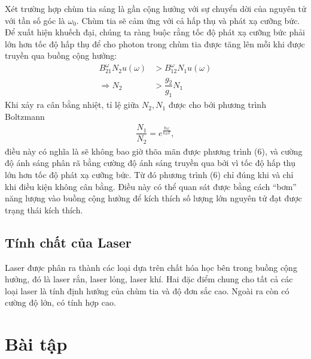 \documentclass{article}
\newcommand{\f}[2]{\dfrac{#1}{#2}}
\begin{document}
Xét trường hợp chùm tia sáng là gần cộng hưởng với sự chuyển dời của nguyên tử với tần số góc là $\omega_0$. Chùm tia sẽ cảm ứng với cả hấp thụ và phát xạ cưỡng bức. Để xuất hiện khuếch đại, chúng ta ràng buộc rằng tốc độ phát xạ cưỡng bức phải lớn hơn tốc độ hấp thụ để cho photon trong chùm tia được tăng lên mỗi khi được truyền qua buồng cộng hưởng:
\begin{align}
	B_{21}^{\omega} N_2 u(\omega) & > B_{12}^{\omega} N_1 u(\omega) \\
	\Rightarrow N_2               & > \f{g_2}{g_1}N_1
\end{align}
Khi xảy ra cân bằng nhiệt, tỉ lệ giữa $N_2,N_1$ được cho bởi phương trình Boltzmann
\begin{align*}
	\f{N_1}{N_2} = e^{\frac{\hbar \omega}{k_B T}},
\end{align*}
điều này có nghĩa là sẽ không bao giờ thõa mãn được phương trình (6), và cường độ ánh sáng phân rã bằng cường độ ánh sáng truyền qua bởi vì tốc độ hấp thụ	lớn hơn tốc độ phát xạ cưỡng bức. Từ đó phương trình (6) chỉ đúng khi và chỉ khi điều kiện không cân bằng. Điều này có thể quan sát được bằng cách ``bơm'' năng lượng vào buồng cộng hưởng để kích thích số lượng lớn nguyên tử đạt được trạng thái kích thích.

\subsection{Tính chất của Laser}
Laser được phân ra thành các loại dựa trên chất hóa học bên trong buồng cộng hưởng, đó là laser rắn, laser lỏng, laser khí. Hai đặc điểm chung cho tất cả các loại laser là tính định hướng của chùm tia và độ đơn sắc cao. Ngoài ra còn có cường độ lớn, có tính hợp cao.

\section{Bài tập}
\end{document}

